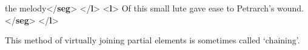 \begin{shaded}
the melody{</\textbf{seg}>}\mbox{}\newline 
{</\textbf{l}>}\mbox{}\newline 
{<\textbf{l}>}\mbox{}\newline 
{}Of this small lute gave ease to Petrarch's wound.{</\textbf{seg}>}\mbox{}\newline 
{</\textbf{l}>}\end{shaded}\egroup\par \noindent  This method of virtually joining partial elements is sometimes called ‘chaining’.\par
